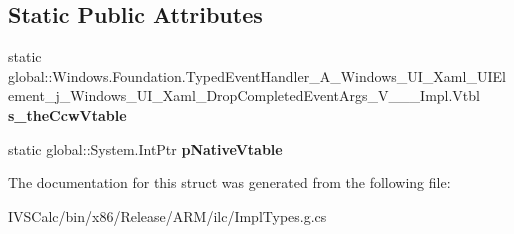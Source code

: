 \subsection*{Static Public Attributes}
\begin{DoxyCompactItemize}
\item 
\mbox{\label{struct_windows_1_1_foundation_1_1_typed_event_handler___a___windows___u_i___xaml___u_i_element__c6192b159f25e6e797ea21530cd542d3_a78fb9491fd47d91aa94939fedd461c2f}} 
static global\+::\+Windows.\+Foundation.\+Typed\+Event\+Handler\+\_\+\+A\+\_\+\+Windows\+\_\+\+U\+I\+\_\+\+Xaml\+\_\+\+U\+I\+Element\+\_\+j\+\_\+\+Windows\+\_\+\+U\+I\+\_\+\+Xaml\+\_\+\+Drop\+Completed\+Event\+Args\+\_\+\+V\+\_\+\+\_\+\+\_\+\+Impl.\+Vtbl {\bfseries s\+\_\+the\+Ccw\+Vtable}
\item 
\mbox{\label{struct_windows_1_1_foundation_1_1_typed_event_handler___a___windows___u_i___xaml___u_i_element__c6192b159f25e6e797ea21530cd542d3_a4f969660048661f6a31bab770740ba5a}} 
static global\+::\+System.\+Int\+Ptr {\bfseries p\+Native\+Vtable}
\end{DoxyCompactItemize}


The documentation for this struct was generated from the following file\+:\begin{DoxyCompactItemize}
\item 
I\+V\+S\+Calc/bin/x86/\+Release/\+A\+R\+M/ilc/Impl\+Types.\+g.\+cs\end{DoxyCompactItemize}
